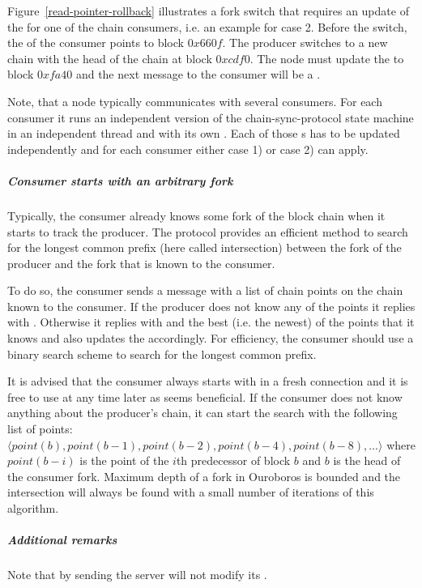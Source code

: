 Figure~\ref{read-pointer-rollback} illustrates a fork switch that requires an update of the \readpointer{}
for one of the chain consumers, i.e. an example for case 2.
Before the switch, the \readpointer{} of the consumer points to block $0x660f$.
The producer switches to a new chain with the head of the chain at block $0xcdf0$.
The node must update the \readpointer{} to block $0xfa40$ and the next message to the consumer
will be a \MsgRollBackward.

Note, that a node typically communicates with several consumers. For each consumer it runs an independent
version of the chain-sync-protocol state machine in an independent thread and with its own \readpointer{}.
Each of those \readpointer{}s has to be updated independently and for each consumer
either case 1) or case 2) can apply.

\subparagraph{Consumer starts with an arbitrary fork}
Typically, the consumer already knows some fork of the block chain when it
starts to track the producer.
The protocol provides an efficient method to search for the longest common prefix (here called intersection)
between the fork of the producer and the fork that is known to the consumer.

To do so, the consumer sends a \MsgFindIntersect{} message with a list of chain
points on the chain known to the consumer.
If the producer does not know any of the points it replies with \MsgIntersectNotFound.
Otherwise it replies with \MsgIntersectFound{} and the best (i.e. the newest) of the points that it knows
and also updates the \readpointer{} accordingly.
For efficiency, the consumer should use a binary search scheme to search for the longest common
prefix.

It is advised that the consumer always starts with \MsgFindIntersect{} in a fresh connection
and it is free to use \MsgFindIntersect{} at any time later as seems beneficial.
If the consumer does not know anything about the producer's chain,
it can start the search with the following list of points:
$\langle point(b), point(b-1), point(b-2), point(b-4), point (b-8),\ldots \rangle$
where $point(b-i)$ is the point of the $i$th predecessor of block $b$ and
$b$ is the head of the consumer fork.
Maximum depth of a fork in Ouroboros is bounded and the intersection will always be found with a small number of
iterations of this algorithm.

\subparagraph{Additional remarks}
Note that by sending \MsgFindIntersect{} the server will not modify its
\readpointer{}.

